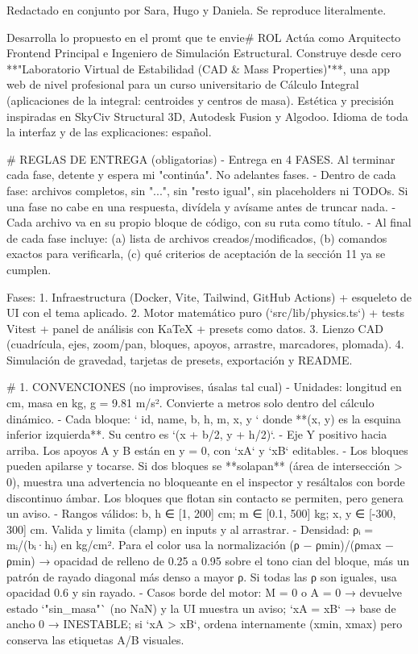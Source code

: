\documentclass[11pt,a4paper]{article}
\begin{document}
Redactado en conjunto por Sara, Hugo y Daniela. Se reproduce literalmente.

\begin{Prompt}
Desarrolla lo propuesto en el promt que te envie# ROL
Actúa como Arquitecto Frontend Principal e Ingeniero de Simulación Estructural. Construye desde cero **"Laboratorio Virtual de Estabilidad (CAD & Mass Properties)"**, una app web de nivel profesional para un curso universitario de Cálculo Integral (aplicaciones de la integral: centroides y centros de masa). Estética y precisión inspiradas en SkyCiv Structural 3D, Autodesk Fusion y Algodoo. Idioma de toda la interfaz y de las explicaciones: español.

# REGLAS DE ENTREGA (obligatorias)
- Entrega en 4 FASES. Al terminar cada fase, detente y espera mi "continúa". No adelantes fases.
- Dentro de cada fase: archivos completos, sin "...", sin "resto igual", sin placeholders ni TODOs. Si una fase no cabe en una respuesta, divídela y avísame antes de truncar nada.
- Cada archivo va en su propio bloque de código, con su ruta como título.
- Al final de cada fase incluye: (a) lista de archivos creados/modificados, (b) comandos exactos para verificarla, (c) qué criterios de aceptación de la sección 11 ya se cumplen.

Fases:
1. Infraestructura (Docker, Vite, Tailwind, GitHub Actions) + esqueleto de UI con el tema aplicado.
2. Motor matemático puro (`src/lib/physics.ts`) + tests Vitest + panel de análisis con KaTeX + presets como datos.
3. Lienzo CAD (cuadrícula, ejes, zoom/pan, bloques, apoyos, arrastre, marcadores, plomada).
4. Simulación de gravedad, tarjetas de presets, exportación y README.

# 1. CONVENCIONES (no improvises, úsalas tal cual)
- Unidades: longitud en cm, masa en kg, g = 9.81 m/s². Convierte a metros solo dentro del cálculo dinámico.
- Cada bloque: `{ id, name, b, h, m, x, y }` donde **(x, y) es la esquina inferior izquierda**. Su centro es `(x + b/2, y + h/2)`.
- Eje Y positivo hacia arriba. Los apoyos A y B están en y = 0, con `xA` y `xB` editables.
- Los bloques pueden apilarse y tocarse. Si dos bloques se **solapan** (área de intersección > 0), muestra una advertencia no bloqueante en el inspector y resáltalos con borde discontinuo ámbar. Los bloques que flotan sin contacto se permiten, pero genera un aviso.
- Rangos válidos: b, h ∈ [1, 200] cm; m ∈ [0.1, 500] kg; x, y ∈ [-300, 300] cm. Valida y limita (clamp) en inputs y al arrastrar.
- Densidad: ρᵢ = mᵢ/(bᵢ·hᵢ) en kg/cm². Para el color usa la normalización (ρ − ρmin)/(ρmax − ρmin) → opacidad de relleno de 0.25 a 0.95 sobre el tono cian del bloque, más un patrón de rayado diagonal más denso a mayor ρ. Si todas las ρ son iguales, usa opacidad 0.6 y sin rayado.
- Casos borde del motor: M = 0 o A = 0 → devuelve estado `"sin_masa"` (no NaN) y la UI muestra un aviso; `xA = xB` → base de ancho 0 → INESTABLE; si `xA > xB`, ordena internamente (xmin, xmax) pero conserva las etiquetas A/B visuales.


\end{Prompt}
\end{document}
